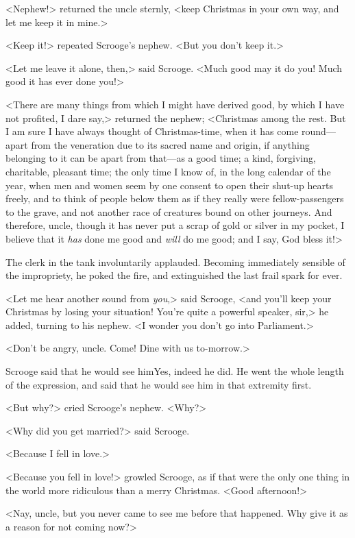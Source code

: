 <Nephew!> returned the uncle sternly, <keep Christmas in your own way, and let me keep it in mine.>

<Keep it!> repeated Scrooge's nephew. <But you don't keep it.>

<Let me leave it alone, then,> said Scrooge. <Much good may it do you! Much good it has ever done you!>

<There are many things from which I might have derived good, by which I have not profited, I dare say,> returned the nephew; <Christmas among the rest. But I am sure I have always thought of Christmas-time, when it has come round—apart from the veneration due to its sacred name and origin, if anything belonging to it can be apart from that—as a good time; a kind, forgiving, charitable, pleasant time; the only time I know of, in the long calendar of the year, when men and women seem by one consent to open their shut-up hearts freely, and to think of people below them as if they really were fellow-passengers to the grave, and not another race of creatures bound on other journeys. And therefore, uncle, though it has never put a scrap of gold or silver in my pocket, I believe that it \textit{has} done me good and \textit{will} do me good; and I say, God bless it!>

The clerk in the tank involuntarily applauded. Becoming immediately sensible of the impropriety, he poked the fire, and extinguished the last frail spark for ever.

<Let me hear another sound from \textit{you},> said Scrooge, <and you'll keep your Christmas by losing your situation! You're quite a powerful speaker, sir,> he added, turning to his nephew. <I wonder you don't go into Parliament.>

<Don't be angry, uncle. Come! Dine with us to-morrow.>

Scrooge said that he would see him\doubleemdash Yes, indeed he did. He went the whole length of the expression, and said that he would see him in that extremity first.

<But why?> cried Scrooge's nephew. <Why?>

<Why did you get married?> said Scrooge.

<Because I fell in love.>

<Because you fell in love!> growled Scrooge, as if that were the only one thing in the world more ridiculous than a merry Christmas. <Good afternoon!>

<Nay, uncle, but you never came to see me before that happened. Why give it as a reason for not coming now?>

